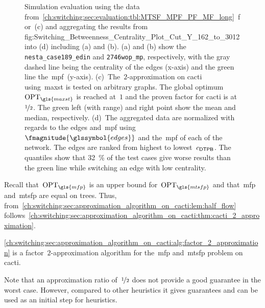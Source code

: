 \begin{center}
\begin{figure}[t!]
\begin{subfigure}[b]{.498\textwidth}
        \end{subfigure}%
        \caption[Simulation results for switching.]{Simulation evaluation using
        the data
        from~\cref{ch:switching:sec:evaluation:tbl:MTSF_MPF_PF_MF_long}~for~(c)
        and aggregating the results
        from~
        {fig:Switching_Betweenness_Centrality_Plot_Cut_Y_162_to_3012} into (d)
        including (a) and (b). (a) and (b) show the
        \texttt{nesta\_case189\_edin} and \texttt{2746wop\_mp}, respectively,
        with the gray dashed line being the centrality of the edges (x-axis) and
        the green line the~\gls{mpf}~(y-axis). (c)~The~$2$-approximation on
        cacti using~\gls{maxst} is tested on arbitrary graphs. The global
        optimum~$\opt_{\gls{maxst}}$ is reached at~$1$ and the proven factor for
        cacti is at~$\nicefrac{1}{2}$. The green left (with range) and right
        point show the mean and median, respectively. (d)~The aggregated data
        are normalized with regards to the edges and~\gls{mpf}
        using~$\fmagnitude{\glssymbol{edges}}$ and the~\gls{mpf} of each of the
        network. The edges are ranked from highest to lowest~$c_{\mathsf{\mathsf{DTP} B}}$. The
        quantiles show that 32~\% of the test cases give worse results than the
        green line while switching an edge with low centrality.}%
        \label{ch:switching:sec:evaluation:fig:simulations}
    \end{figure}
\end{center}
\endgroup
% 
Recall that~$\opt_{\gls{mfp}}$ is an upper bound for~$\opt_{\gls{mtsfp}}$ and
that~\gls{mfp} and~\gls{mtsfp} are equal on trees. Thus,
from~\cref{ch:switching:sec:approximation_algorithm_on_cacti:lem:half_flow}
follows~\cref{ch:switching:sec:approximation_algorithm_on_cacti:thm:cacti_2_approximation}. %
% 
% 
\begin{theorem}
\label{ch:switching:sec:approximation_algorithm_on_cacti:thm:cacti_2_approximation}
% 
\cref{ch:switching:sec:approximation_algorithm_on_cacti:alg:factor_2_approximation}
is a factor~$2$-approximation algorithm for the~\gls{mfp} and~\gls{mtsfp} problem
on cacti.
\end{theorem}
% 
Note that an approximation ratio of~$\nicefrac{1}{2}$ does not provide a good
guarantee in the worst case. However, compared to other heuristics it gives
guarantees and can be used as an initial step for heuristics.
% 
